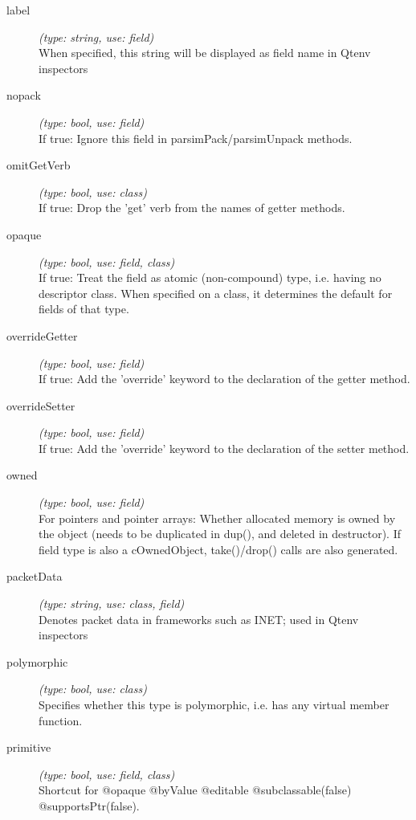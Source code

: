 \begin{description}
\item[label] \textit{(type: string, use: field)} \\
    When specified, this string will be displayed as field name in Qtenv
    inspectors

\item[nopack] \textit{(type: bool, use: field)} \\
    If true: Ignore this field in parsimPack/parsimUnpack methods.

\item[omitGetVerb] \textit{(type: bool, use: class)} \\
    If true: Drop the 'get' verb from the names of getter methods.

\item[opaque] \textit{(type: bool, use: field, class)} \\
    If true: Treat the field as atomic (non-compound) type, i.e. having no
    descriptor class. When specified on a class, it determines the default for
    fields of that type.

\item[overrideGetter] \textit{(type: bool, use: field)} \\
    If true: Add the 'override' keyword to the declaration of the getter method.

\item[overrideSetter] \textit{(type: bool, use: field)} \\
    If true: Add the 'override' keyword to the declaration of the setter method.

\item[owned] \textit{(type: bool, use: field)} \\
    For pointers and pointer arrays: Whether allocated memory is owned by the
    object (needs to be duplicated in dup(), and deleted in destructor). If
    field type is also a cOwnedObject, take()/drop() calls are also generated.

\item[packetData] \textit{(type: string, use: class, field)} \\
    Denotes packet data in frameworks such as INET; used in Qtenv inspectors

\item[polymorphic] \textit{(type: bool, use: class)} \\
    Specifies whether this type is polymorphic, i.e. has any virtual member
    function.

\item[primitive] \textit{(type: bool, use: field, class)} \\
    Shortcut for @opaque @byValue @editable @subclassable(false)
    @supportsPtr(false).


\end{description}

